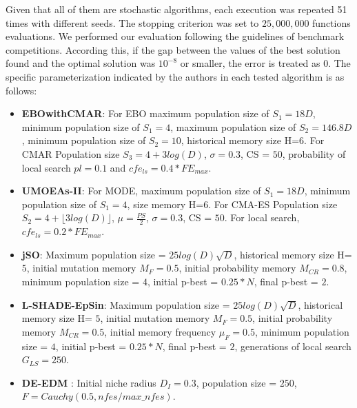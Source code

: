 Given that all of them are stochastic algorithms, each execution was repeated 51 times with different seeds.
%
The stopping criterion was set to $25,000,000$ functions evaluations.
%
We performed our evaluation following the guidelines of \CEC{} benchmark competitions.
%
According this, if the gap between the values of the best solution found and the optimal solution was $10^{-8}$ or smaller, the error is treated as $0$.
%
%
The specific parameterization indicated by the authors in each tested algorithm is as follows:
\begin{itemize}
\item \textbf{EBOwithCMAR}: For EBO maximum population size of $S_1 = 18D$, minimum population size of $S_1 = 4$, maximum population size of $S_2 = 146.8D$, minimum population size of $S_2 = 10$, historical memory size H=$6$. For CMAR Population size $S_3 = 4 + 3log(D)$, $\sigma=0.3$, CS = $50$, probability of local search $pl = 0.1$ and $cfe_{ls} = 0.4* FE_{max}$.
\item \textbf{UMOEAs-II}: For MODE, maximum population size of $S_1 = 18D$, minimum population size of $S_1 = 4$, size memory H=$6$. For CMA-ES Population size $S_2 = 4 + \lfloor 3log(D) \rfloor$, $\mu=\frac{PS}{2}$, $\sigma=0.3$, CS = $50$. For local search, $cfe_{ls} = 0.2 * FE_{max}$.
\item \textbf{jSO}: Maximum population size = $25log(D)\sqrt{D}$, historical memory size H= $5$, initial mutation memory $M_F = 0.5$, initial probability memory $M_{CR} = 0.8$, minimum population size = $4$, initial p-best = $0.25*N$, final p-best = $2$.
\item \textbf{L-SHADE-EpSin}: Maximum population size = $25log(D)\sqrt{D}$, historical memory size H= $5$, initial mutation memory $M_F = 0.5$, initial probability memory $M_{CR} = 0.5$, initial memory frequency $\mu_F = 0.5$, minimum population size = $4$, initial p-best = $0.25*N$, final p-best = $2$, generations of local search $G_{LS}=250$.
\item \textbf{ \textsc{DE-EDM} }: Initial niche radius $D_I = 0.3$, population size = $250$, $F = Cauchy(0.5, nfes/max\_nfes)$.
\end{itemize}
%


